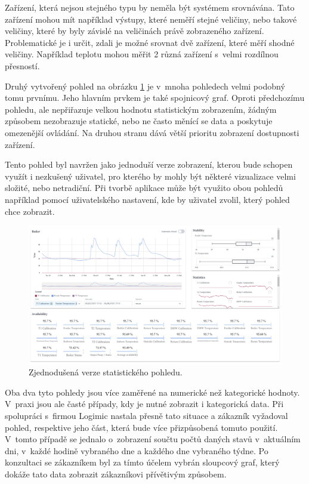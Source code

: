 Zařízení, která nejsou stejného typu by neměla být systémem srovnávána. Tato zařízení mohou mít například výstupy, které neměří stejné veličiny, nebo takové veličiny, které by byly závislé na veličinách právě zobrazeného zařízení. Problematické je i určit, zdali je možné srovnat dvě zařízení, které měří shodné veličiny. Například teplotu mohou měřit 2 různá zařízení s~velmi rozdílnou přesností. 

Druhý vytvořený pohled na obrázku \ref{dasboard2} je v~mnoha pohledech velmi podobný tomu prvnímu. Jeho hlavním prvkem je také spojnicový graf. Oproti předchozímu pohledu, ale nepřiřazuje velkou hodnotu statistickým zobrazením, žádným způsobem nezobrazuje statické, nebo ne často měnící se data a poskytuje omezenější ovládání. Na druhou stranu dává větší prioritu zobrazení dostupnosti zařízení.

Tento pohled byl navržen jako jednoduší verze zobrazení, kterou bude schopen využít i nezkušený uživatel, pro kterého by mohly být některé vizualizace velmi složité, nebo netradiční. Při tvorbě aplikace může být využito obou pohledů například pomocí uživatelského nastavení, kde by uživatel zvolil, který pohled chce zobrazit.

\begin{figure}[H]
\label{dasboard2}
\begin{center}
    \includegraphics[width=\textwidth]{obrazky-figures/dashboard2.pdf}
\end{center}
\caption{Zjednodušená verze statistického pohledu.}
\end{figure}

Oba dva tyto pohledy jsou více zaměřené na numerické než kategorické hodnoty. V~praxi jsou ale časté případy, kdy je nutné zobrazit i kategorická data. Při spolupráci s~firmou Logimic nastala přesně tato situace a zákazník vyžadoval pohled, respektive jeho část, která bude více přizpůsobená tomuto použití. V~tomto případě se jednalo o~zobrazení součtu počtů daných stavů v~aktuálním dni, v~každé hodině vybraného dne a každého dne vybraného týdne. Po konzultaci se zákazníkem byl za tímto účelem vybrán sloupcový graf, který dokáže tato data zobrazit zákazníkovi přívětivým způsobem. 

